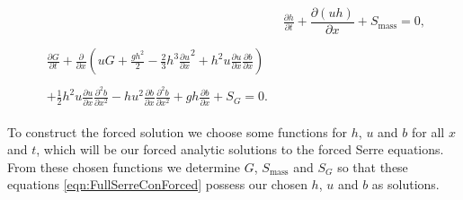 \begin{subequations}
	\label{eqn:FullSerreConForced}
	\begin{align}
	& \frac{\partial h}{\partial t} + \dfrac{\partial (uh)}{\partial x} + S_{\text{mass}}  = 0 ,\label{eqn:FullSerreConMassForced}  \\ \nonumber \\
	\begin{split}
	\label{eqn:SerreconsconmomForced}
	\frac{\partial G}{\partial t}  + \frac{\partial}{\partial x} \left( {u} G + \frac{gh^2}{2} - \frac{2}{3}h^3 \frac{\partial {u}}{\partial x}^2 + h^2 {u}\frac{\partial {u}}{\partial x}\frac{\partial b}{\partial x} \right) \\ \\ + \frac{1}{2}h^2 {u} \frac{\partial {u}}{\partial x} \frac{\partial^2 b}{\partial x^2}  - h {u}^2\frac{\partial b}{\partial x}\frac{\partial^2 b}{\partial x^2} + gh\frac{\partial b}{\partial x} + S_{G} = 0.
	\end{split}
	\end{align}
\end{subequations}

To construct the forced solution we choose some functions for $h$, $u$ and $b$ for all $x$ and $t$, which will be our forced analytic solutions to the forced Serre equations. From these chosen functions we determine $G$, $S_{\text{mass}}$ and $S_{G}$ so that these equations \eqref{eqn:FullSerreConForced} possess our chosen $h$, $u$ and $b$ as solutions.

